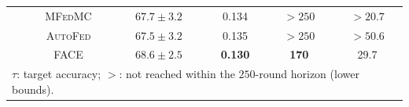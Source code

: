 \begin{table}[t]
\begin{tabular}{c|c|c|c|c|c}
        & \textsc{MFedMC}
        & $67.7 \pm 3.2$
        & 0.134
        & $>250$
        & $>20.7$ \\

        & \textsc{AutoFed}
        & $67.5 \pm 3.2$
        & 0.135
        & $>250$
        & $>50.6$ \\[1pt]

        & \textsc{FACE}
        & $\mathbf{68.6 \pm 2.5}$
        & \textbf{0.130}
        & \textbf{170}
        & 29.7 \\

        \bottomrule
        \multicolumn{6}{l}{
            \scriptsize $\tau$: target accuracy; $>$: not reached within the $250$-round horizon (lower bounds).
        }
    \end{tabular}
\end{table}
